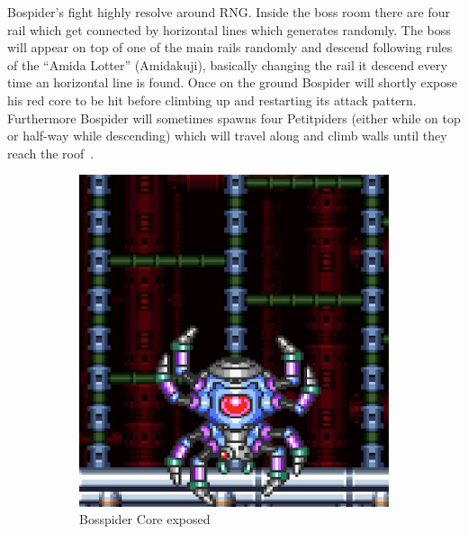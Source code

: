 Bospider's fight highly resolve around RNG. Inside the boss room there are four rail which get connected by horizontal lines which generates randomly. The boss will appear on top of one of the main rails randomly and descend following rules of the ``Amida Lotter'' (Amidakuji), basically changing the rail it descend every time an horizontal line is found. Once on the ground Bospider will shortly expose his red core to be hit before climbing up and restarting its attack pattern. Furthermore Bospider will sometimes spawns four Petitpiders (either while on top or half-way while descending) which will travel along and climb walls until they reach the roof~\cite{wiki:Bospider}.
\begin{figure}[htp]
	\centering
	\begin{subfigure}[t]{0.40\linewidth}
		\centering
		\includegraphics[width=\linewidth]{figures/X1/Sigma_stages/Bospider_core.jpg}
		\caption{Bosspider Core exposed}
	\end{subfigure}
	\begin{subfigure}[t]{0.45\linewidth}
		\centering

\end{subfigure}
\end{figure}
